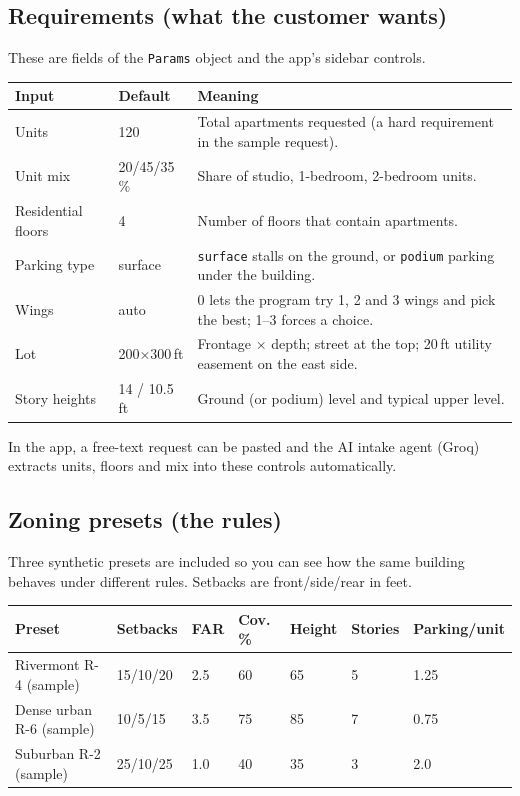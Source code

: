 \documentclass[11pt]{article}
\begin{document}
\subsection{Requirements (what the customer wants)}
These are fields of the \texttt{Params} object and the app's sidebar controls.
\begin{table}[H]\centering\small
\begin{tabular}{@{}llp{8cm}@{}}\toprule
Input & Default & Meaning \\ \midrule
Units & 120 & Total apartments requested (a hard requirement in the sample request). \\
Unit mix & 20/45/35\,\% & Share of studio, 1-bedroom, 2-bedroom units. \\
Residential floors & 4 & Number of floors that contain apartments. \\
Parking type & surface & \texttt{surface} stalls on the ground, or \texttt{podium} parking under the building. \\
Wings & auto & 0 lets the program try 1, 2 and 3 wings and pick the best; 1--3 forces a choice. \\
Lot & 200$\times$300\,ft & Frontage $\times$ depth; street at the top; 20\,ft utility easement on the east side. \\
Story heights & 14 / 10.5\,ft & Ground (or podium) level and typical upper level. \\ \bottomrule
\end{tabular}\end{table}
In the app, a free-text request can be pasted and the AI intake agent (Groq) extracts units, floors and mix into these controls automatically.

\subsection{Zoning presets (the rules)}
Three synthetic presets are included so you can see how the same building behaves under different rules. Setbacks are front/side/rear in feet.
\begin{table}[H]\centering\small
\begin{tabular}{lllllll}\toprule
Preset & Setbacks & FAR & Cov.\,\% & Height & Stories & Parking/unit \\ \midrule
Rivermont R-4 (sample) & 15/10/20 & 2.5 & 60 & 65 & 5 & 1.25 \\
Dense urban R-6 (sample) & 10/5/15 & 3.5 & 75 & 85 & 7 & 0.75 \\
Suburban R-2 (sample) & 25/10/25 & 1.0 & 40 & 35 & 3 & 2.0 \\
\bottomrule\end{tabular}\end{table}
\end{document}
